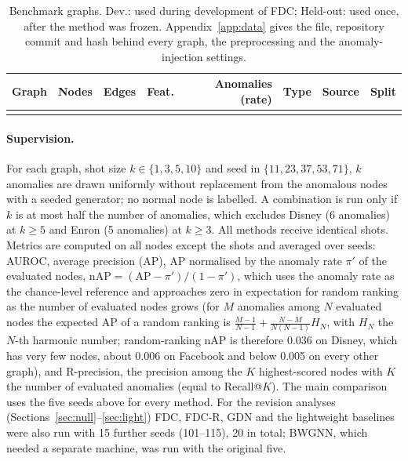 \documentclass[pdflatex,sn-mathphys-ay]{sn-jnl}
\theoremstyle{plain}
\theoremstyle{remark}
\begin{document}
\begin{table}[!ht]
\caption{Benchmark graphs. Dev.: used during development of FDC; Held-out: used once, after the method was frozen. Appendix~\ref{app:data} gives the file, repository commit and hash behind every graph, the preprocessing and the anomaly-injection settings.}
\label{tab:datasets}
\footnotesize
\begin{tabular*}{\textwidth}{@{\extracolsep{\fill}}lrrrrlll@{}}
\toprule
Graph & Nodes & Edges & Feat. & Anomalies (rate) & Type & Source & Split \\
\midrule

\botrule
\end{tabular*}
\end{table}

\paragraph{Supervision.} For each graph, shot size $k\in\{1,3,5,10\}$ and seed in $\{11,23,37,53,71\}$, $k$ anomalies are drawn uniformly without replacement from the anomalous nodes with a seeded generator; no normal node is labelled. A combination is run only if $k$ is at most half the number of anomalies, which excludes Disney (6 anomalies) at $k\ge5$ and Enron (5 anomalies) at $k\ge3$. All methods receive identical shots. Metrics are computed on all nodes except the shots and averaged over seeds: AUROC, average precision (AP), AP normalised by the anomaly rate $\pi'$ of the evaluated nodes, $\mathrm{nAP}=(\mathrm{AP}-\pi')/(1-\pi')$, which uses the anomaly rate as the chance-level reference and approaches zero in expectation for random ranking as the number of evaluated nodes grows (for $M$ anomalies among $N$ evaluated nodes the expected AP of a random ranking is $\frac{M-1}{N-1}+\frac{N-M}{N(N-1)}H_N$, with $H_N$ the $N$-th harmonic number; random-ranking nAP is therefore 0.036 on Disney, which has very few nodes, about 0.006 on Facebook and below 0.005 on every other graph), and R-precision, the precision among the $K$ highest-scored nodes with $K$ the number of evaluated anomalies (equal to Recall@$K$). The main comparison uses the five seeds above for every method. For the revision analyses (Sections~\ref{sec:null}--\ref{sec:light}) FDC, FDC-R, GDN and the lightweight baselines were also run with 15 further seeds (101--115), 20 in total; BWGNN, which needed a separate machine, was run with the original five.
\end{document}

